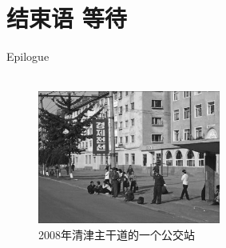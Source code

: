 \fancyhead[RO]{{\tiny{\textcolor{Gray}{\FA \ }}}\thepage}
\fancyhead[LE]{{\tiny{\textcolor{Gray}{\FA \ }}}\thepage}
\fancyfoot[LE,RO]{}
\fancyfoot[LO,CE]{}
\fancyfoot[CO,RE]{}
\chapter*{结束语 等待}
\vspace{15mm}
\begin{flushright}
	\textcolor{PinYinColor}{\EN \huge{Epilogue\\
	\ \\}}
\end{flushright}

\begin{figure}[!htbp]
	\centering
	\includegraphics[width=6cm]{./Chapters/Images/21.jpg}
	\caption*{2008年清津主干道的一个公交站}
\end{figure}


